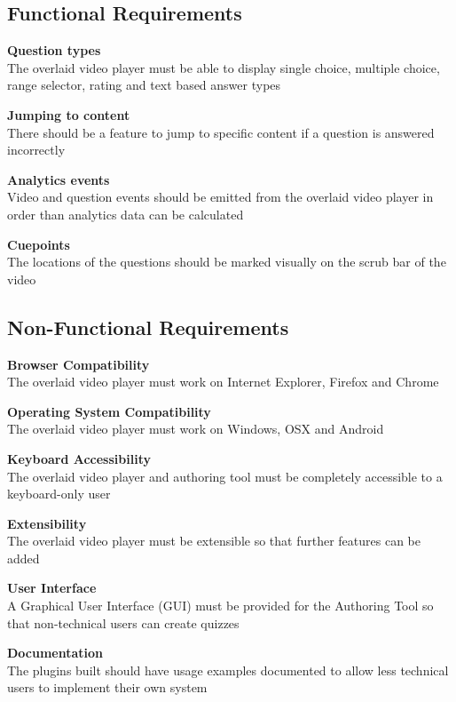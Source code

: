 \subsection{Functional Requirements}
\begin{requirement}[%
 label=\textbf{F\arabic*}]
\item \textbf{Question types}  \hfill \\ The overlaid video player must be able to display single choice, multiple choice, range selector, rating and text based answer types\label{Req:Question types}
\item \textbf{Jumping to content} \hfill \\ There should be a feature to jump to specific content if a question is answered incorrectly \label{Req:Jumping to content}
\item \textbf{Analytics events} \hfill \\ Video and question events should be emitted from the overlaid video player in order than analytics data can be calculated \label{Req:Analytics events}
\item \textbf{Cuepoints} \hfill \\ The locations of the questions should be marked visually on the scrub bar of the video \label{Req:Cuepoints}
\end{requirement}

\subsection{Non-Functional Requirements}
\begin{requirement}[%
 label=\textbf{N\arabic*}]
\item \textbf{Browser Compatibility} \hfill \\ The overlaid video player must work on Internet Explorer, Firefox and Chrome \label{Req:Browser Compatibility}
\item \textbf{Operating System Compatibility} \hfill \\ The overlaid video player must work on Windows, OSX and Android \label{Req:OS Compatibility}
\item \textbf{Keyboard Accessibility} \hfill \\ The overlaid video player and authoring tool must be completely accessible to a keyboard-only user \label{Req:Keyboard Accessibility}
\item \textbf{Extensibility} \hfill \\ The overlaid video player must be extensible so that further features can be added \label{Req:Extensibility} 
\item \textbf{User Interface} \hfill \\ A Graphical User Interface (GUI) must be provided for the Authoring Tool so that non-technical users can create quizzes \label{Req:User Interface}
\item \textbf{Documentation} \hfill \\ The plugins built should have usage examples documented to allow less technical users to implement their own system \label{Req:Documentation}
\end{requirement}
 

